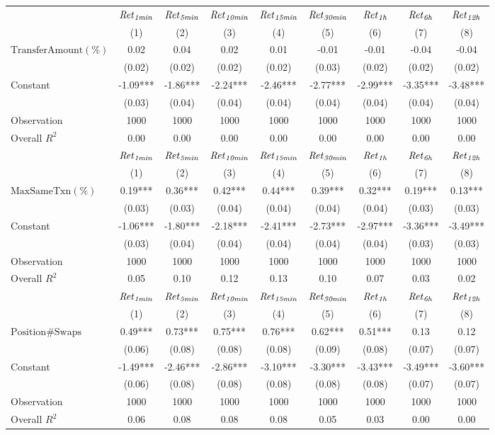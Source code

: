 \begin{tabular}{lcccccccc}
\hline
 & ${\it Ret}_{\it 1min}$ & ${\it Ret}_{\it 5min}$ & ${\it Ret}_{\it 10min}$ & ${\it Ret}_{\it 15min}$ & ${\it Ret}_{\it 30min}$ & ${\it Ret}_{\it 1h}$ & ${\it Ret}_{\it 6h}$ & ${\it Ret}_{\it 12h}$ \\
 & (1) & (2) & (3) & (4) & (5) & (6) & (7) & (8) \\
\hline
$\mathrm{Transfer Amount (\%)}$ & 0.02 & 0.04 & 0.02 & 0.01 & -0.01 & -0.01 & -0.04 & -0.04 \\
 & (0.02) & (0.02) & (0.02) & (0.02) & (0.03) & (0.02) & (0.02) & (0.02) \\
Constant & -1.09*** & -1.86*** & -2.24*** & -2.46*** & -2.77*** & -2.99*** & -3.35*** & -3.48*** \\
 & (0.03) & (0.04) & (0.04) & (0.04) & (0.04) & (0.04) & (0.04) & (0.04) \\
Observation & 1000 & 1000 & 1000 & 1000 & 1000 & 1000 & 1000 & 1000 \\
Overall $R^2$ & 0.00 & 0.00 & 0.00 & 0.00 & 0.00 & 0.00 & 0.00 & 0.00 \\
\hline
 & ${\it Ret}_{\it 1min}$ & ${\it Ret}_{\it 5min}$ & ${\it Ret}_{\it 10min}$ & ${\it Ret}_{\it 15min}$ & ${\it Ret}_{\it 30min}$ & ${\it Ret}_{\it 1h}$ & ${\it Ret}_{\it 6h}$ & ${\it Ret}_{\it 12h}$ \\
 & (1) & (2) & (3) & (4) & (5) & (6) & (7) & (8) \\
\hline
$\mathrm{Max Same Txn (\%)}$ & 0.19*** & 0.36*** & 0.42*** & 0.44*** & 0.39*** & 0.32*** & 0.19*** & 0.13*** \\
 & (0.03) & (0.03) & (0.04) & (0.04) & (0.04) & (0.04) & (0.03) & (0.03) \\
Constant & -1.06*** & -1.80*** & -2.18*** & -2.41*** & -2.73*** & -2.97*** & -3.36*** & -3.49*** \\
 & (0.03) & (0.04) & (0.04) & (0.04) & (0.04) & (0.04) & (0.03) & (0.03) \\
Observation & 1000 & 1000 & 1000 & 1000 & 1000 & 1000 & 1000 & 1000 \\
Overall $R^2$ & 0.05 & 0.10 & 0.12 & 0.13 & 0.10 & 0.07 & 0.03 & 0.02 \\
\hline
 & ${\it Ret}_{\it 1min}$ & ${\it Ret}_{\it 5min}$ & ${\it Ret}_{\it 10min}$ & ${\it Ret}_{\it 15min}$ & ${\it Ret}_{\it 30min}$ & ${\it Ret}_{\it 1h}$ & ${\it Ret}_{\it 6h}$ & ${\it Ret}_{\it 12h}$ \\
 & (1) & (2) & (3) & (4) & (5) & (6) & (7) & (8) \\
\hline
$\mathrm{Position\#Swaps}$ & 0.49*** & 0.73*** & 0.75*** & 0.76*** & 0.62*** & 0.51*** & 0.13 & 0.12 \\
 & (0.06) & (0.08) & (0.08) & (0.08) & (0.09) & (0.08) & (0.07) & (0.07) \\
Constant & -1.49*** & -2.46*** & -2.86*** & -3.10*** & -3.30*** & -3.43*** & -3.49*** & -3.60*** \\
 & (0.06) & (0.08) & (0.08) & (0.08) & (0.08) & (0.08) & (0.07) & (0.07) \\
Observation & 1000 & 1000 & 1000 & 1000 & 1000 & 1000 & 1000 & 1000 \\
Overall $R^2$ & 0.06 & 0.08 & 0.08 & 0.08 & 0.05 & 0.03 & 0.00 & 0.00 \\
\hline
\end{tabular}
